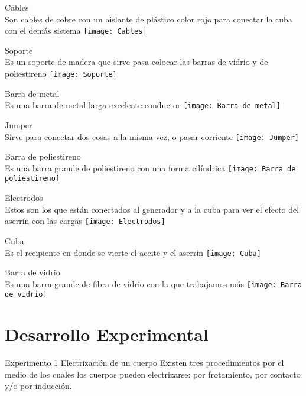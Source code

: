 \documentclass[14pt]{article}
\begin{document}
Cables\\ 
Son cables de cobre con un aislante de plástico color rojo para conectar la cuba con el demás sistema 
\texttt{[image: Cables]}

Soporte \\
Es un soporte de madera que sirve pasa colocar las barras de vidrio y de poliestireno 
\texttt{[image: Soporte]}

Barra de metal \\
Es una barra de metal larga excelente conductor 
\texttt{[image: Barra de metal]}

Jumper \\
Sirve para conectar dos cosas a la misma vez, o pasar corriente 
\texttt{[image: Jumper]}

Barra de poliestireno \\
Es una barra grande de poliestireno con una forma cilíndrica 
\texttt{[image: Barra de poliestireno]}

Electrodos \\
Estos son los que están conectados al generador y a la cuba para ver el efecto del aserrín con las cargas  
\texttt{[image: Electrodos]}

Cuba \\
Es el recipiente en donde se vierte el aceite y el aserrín  
\texttt{[image: Cuba]}

Barra de vidrio \\
Es una barra grande de fibra de vidrio con la que trabajamos más 
\texttt{[image: Barra de vidrio]}

	\section{Desarrollo Experimental}
	Experimento 1 Electrización de un cuerpo
	Existen tres procedimientos por el medio de los cuales los cuerpos pueden electrizarse: por frotamiento, por contacto y/o por inducción. 
\end{document}
